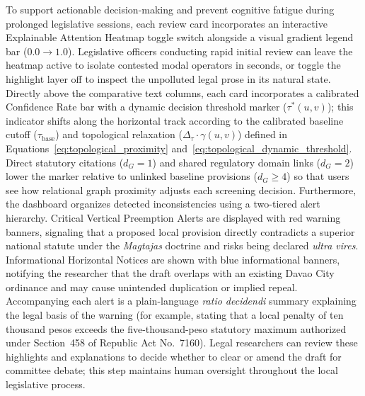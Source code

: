     To support actionable decision-making and prevent cognitive fatigue during prolonged legislative sessions, each review card incorporates an interactive Explainable Attention Heatmap toggle switch alongside a visual gradient legend bar ($0.0 \rightarrow 1.0$). Legislative officers conducting rapid initial review can leave the heatmap active to isolate contested modal operators in seconds, or toggle the highlight layer off to inspect the unpolluted legal prose in its natural state. Directly above the comparative text columns, each card incorporates a calibrated Confidence Rate bar with a dynamic decision threshold marker ($\tau^*(u, v)$); this indicator shifts along the horizontal track according to the calibrated baseline cutoff ($\tau_{\text{base}}$) and topological relaxation ($\Delta_{\tau} \cdot \gamma(u, v)$) defined in Equations~\ref{eq:topological_proximity} and~\ref{eq:topological_dynamic_threshold}. Direct statutory citations ($d_G = 1$) and shared regulatory domain links ($d_G = 2$) lower the marker relative to unlinked baseline provisions ($d_G \ge 4$) so that users see how relational graph proximity adjusts each screening decision. Furthermore, the dashboard organizes detected inconsistencies using a two-tiered alert hierarchy. Critical Vertical Preemption Alerts are displayed with red warning banners, signaling that a proposed local provision directly contradicts a superior national statute under the \textit{Magtajas} doctrine and risks being declared \textit{ultra vires}. Informational Horizontal Notices are shown with blue informational banners, notifying the researcher that the draft overlaps with an existing Davao City ordinance and may cause unintended duplication or implied repeal. Accompanying each alert is a plain-language \textit{ratio decidendi} summary explaining the legal basis of the warning (for example, stating that a local penalty of ten thousand pesos exceeds the five-thousand-peso statutory maximum authorized under Section~458 of Republic Act No.~7160). Legal researchers can review these highlights and explanations to decide whether to clear or amend the draft for committee debate; this step maintains human oversight throughout the local legislative process.

